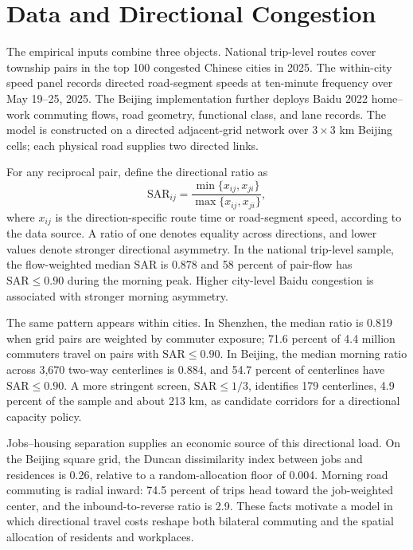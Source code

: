 \documentclass[12pt]{article}
\begin{document}
\section{Data and Directional Congestion}

The empirical inputs combine three objects. National trip-level routes cover township pairs in the top 100 congested Chinese cities in 2025. The within-city speed panel records directed road-segment speeds at ten-minute frequency over May 19--25, 2025. The Beijing implementation further deploys Baidu 2022 home--work commuting flows, road geometry, functional class, and lane records. The model is constructed on a directed adjacent-grid network over $3\times3$ km Beijing cells; each physical road supplies two directed links.

For any reciprocal pair, define the directional ratio as
\begin{equation}
  \mathrm{SAR}_{ij}=\frac{\min\{x_{ij},x_{ji}\}}{\max\{x_{ij},x_{ji}\}},
  \label{eq:sar}
\end{equation}
where $x_{ij}$ is the direction-specific route time or road-segment speed, according to the data source. A ratio of one denotes equality across directions, and lower values denote stronger directional asymmetry. In the national trip-level sample, the flow-weighted median $\mathrm{SAR}$ is 0.878 and 58 percent of pair-flow has $\mathrm{SAR}\leq0.90$ during the morning peak. Higher city-level Baidu congestion is associated with stronger morning asymmetry.

The same pattern appears within cities. In Shenzhen, the median ratio is 0.819 when grid pairs are weighted by commuter exposure; 71.6 percent of 4.4 million commuters travel on pairs with $\mathrm{SAR}\leq0.90$. In Beijing, the median morning ratio across 3,670 two-way centerlines is 0.884, and 54.7 percent of centerlines have $\mathrm{SAR}\leq0.90$. A more stringent screen, $\mathrm{SAR}\leq1/3$, identifies 179 centerlines, 4.9 percent of the sample and about 213 km, as candidate corridors for a directional capacity policy.

Jobs--housing separation supplies an economic source of this directional load. On the Beijing square grid, the Duncan dissimilarity index between jobs and residences is 0.26, relative to a random-allocation floor of 0.004. Morning road commuting is radial inward: 74.5 percent of trips head toward the job-weighted center, and the inbound-to-reverse ratio is 2.9. These facts motivate a model in which directional travel costs reshape both bilateral commuting and the spatial allocation of residents and workplaces.
\end{document}

